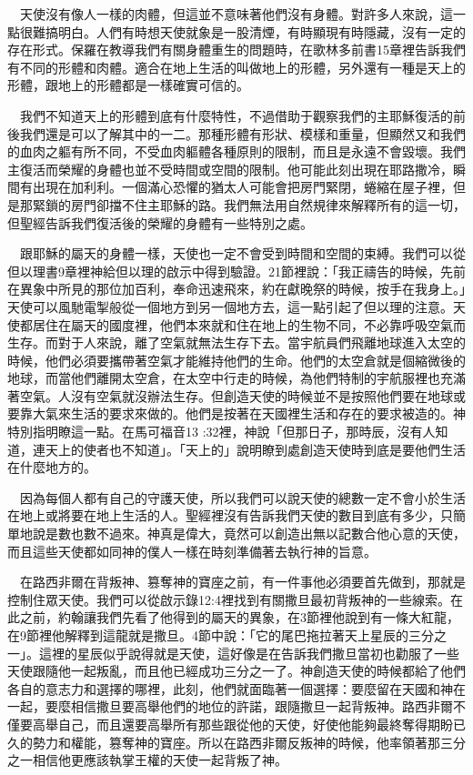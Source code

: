 \documentclass{book}
\begin{document}
　天使沒有像人一樣的肉體，但這並不意味著他們沒有身體。對許多人來說，這一點很難搞明白。人們有時想天使就象是一股清煙，有時顯現有時隱藏，沒有一定的存在形式。保羅在教導我們有關身體重生的問題時，在歌林多前書15章裡告訴我們有不同的形體和肉體。適合在地上生活的叫做地上的形體，另外還有一種是天上的形體，跟地上的形體都是一樣確實可信的。

　我們不知道天上的形體到底有什麼特性，不過借助于觀察我們的主耶穌復活的前後我們還是可以了解其中的一二。那種形體有形狀、模樣和重量，但顯然又和我們的血肉之軀有所不同，不受血肉軀體各種原則的限制，而且是永遠不會毀壞。我們主復活而榮耀的身體也並不受時間或空間的限制。他可能此刻出現在耶路撒冷，瞬間有出現在加利利。一個滿心恐懼的猶太人可能會把房門緊閉，蜷縮在屋子裡，但是那緊鎖的房門卻擋不住主耶穌的路。我們無法用自然規律來解釋所有的這一切，但聖經告訴我們復活後的榮耀的身體有一些特別之處。

　跟耶穌的屬天的身體一樣，天使也一定不會受到時間和空間的束縛。我們可以從但以理書9章裡神給但以理的啟示中得到驗證。21節裡說：「我正禱告的時候，先前在異象中所見的那位加百利，奉命迅速飛來，約在獻晚祭的時候，按手在我身上。」天使可以風馳電掣般從一個地方到另一個地方去，這一點引起了但以理的注意。天使都居住在屬天的國度裡，他們本來就和住在地上的生物不同，不必靠呼吸空氣而生存。而對于人來說，離了空氣就無法生存下去。當宇航員們飛離地球進入太空的時候，他們必須要攜帶著空氣才能維持他們的生命。他們的太空倉就是個縮微後的地球，而當他們離開太空倉，在太空中行走的時候，為他們特制的宇航服裡也充滿著空氣。人沒有空氣就沒辦法生存。但創造天使的時候並不是按照他們要在地球或要靠大氣來生活的要求來做的。他們是按著在天國裡生活和存在的要求被造的。神特別指明瞭這一點。在馬可福音13 :32裡，神說「但那日子，那時辰，沒有人知道，連天上的使者也不知道」。「天上的」說明瞭到處創造天使時到底是要他們生活在什麼地方的。

　因為每個人都有自己的守護天使，所以我們可以說天使的總數一定不會小於生活在地上或將要在地上生活的人。聖經裡沒有告訴我們天使的數目到底有多少，只簡單地說是數也數不過來。神真是偉大，竟然可以創造出無以記數合他心意的天使，而且這些天使都如同神的僕人一樣在時刻準備著去執行神的旨意。

　在路西非爾在背叛神、篡奪神的寶座之前，有一件事他必須要首先做到，那就是控制住眾天使。我們可以從啟示錄12:4裡找到有關撒旦最初背叛神的一些線索。在此之前，約翰讓我們先看了他得到的屬天的異象，在3節裡他說到有一條大紅龍，在9節裡他解釋到這龍就是撒旦。4節中說：「它的尾巴拖拉著天上星辰的三分之一」。這裡的星辰似乎說得就是天使，這好像是在告訴我們撒旦當初也勸服了一些天使跟隨他一起叛亂，而且他已經成功三分之一了。神創造天使的時候都給了他們各自的意志力和選擇的哪裡，此刻，他們就面臨著一個選擇：要麼留在天國和神在一起，要麼相信撒旦要高舉他們的地位的許諾，跟隨撒旦一起背叛神。路西非爾不僅要高舉自己，而且還要高舉所有那些跟從他的天使，好使他能夠最終奪得期盼已久的勢力和權能，篡奪神的寶座。所以在路西非爾反叛神的時候，他率領著那三分之一相信他更應該執掌王權的天使一起背叛了神。
\end{document}
